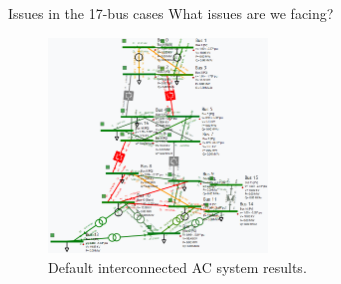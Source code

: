 \begin{frame}{Issues in the 17-bus cases}
    What issues are we facing?
    \begin{figure}[H]
        \centering
    \includegraphics[width=0.52\textwidth]{Images/17bus_issues.png}
    \caption{Default interconnected AC system results.}
    \label{fig:17bus2}
    \end{figure}
\end{frame}

